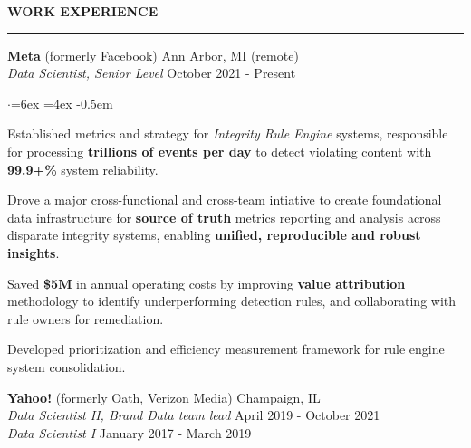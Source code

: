 \documentclass[11pt]{article}
\newenvironment{rSection}[1]{ %
  \sectionskip
  \MakeUppercase{\textbf{#1}} %
  \sectionlineskip
  \hrule %
  \begin{list}{}{ %
    \setlength{\leftmargin}{1.5em} %
  }
  \item[]
}{
  \end{list}
}
\def\sectionlineskip{\smallskip} %
\def\sectionskip{\smallskip} %
\begin{document}
\begin{rSection}{Work Experience}

{\bfseries Meta} (formerly Facebook) \hfill Ann Arbor, MI (remote) \\
{\em \hspace*{2ex} Data Scientist, Senior Level} \hfill October 2021 - Present  %

\begin{list}{$\cdot$}{\leftmargin=6ex \rightmargin=4ex}
  \itemsep -0.5em \vspace{-0.5em}
  \item Established metrics and strategy for \textit{Integrity Rule Engine} systems, responsible for processing \textbf{trillions of events per day} to detect violating content with \textbf{99.9+\%} system reliability.
  \item Drove a major cross-functional and cross-team intiative to create foundational data infrastructure for \textbf{source of truth} metrics reporting and analysis across disparate integrity systems, enabling \textbf{unified, reproducible and robust insights}.
  \item Saved \textbf{\$5M} in annual operating costs by improving \textbf{value attribution} methodology to identify underperforming detection rules, and collaborating with rule owners for remediation.

  \item Developed prioritization and efficiency measurement framework for rule engine system consolidation.
\end{list}

{\bfseries Yahoo!} (formerly Oath, Verizon Media) \hfill Champaign, IL \\
{\em \hspace*{2ex} Data Scientist II, Brand Data team lead} \hfill April 2019 - October 2021 \\
{\em \hspace*{2ex} Data Scientist I} \hfill January 2017 - March 2019



\end{rSection}
\end{document}
